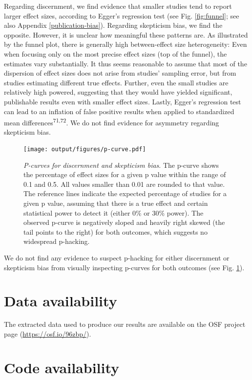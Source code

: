 \documentclass[
  man]{apa6}
\begin{document}
Regarding discernment, we find evidence that smaller studies tend to report larger effect sizes, according to Egger's regression test (see Fig. \ref{fig:funnel}; see also Appendix \ref{publication-bias}). Regarding skepticism bias, we find the opposite. However, it is unclear how meaningful these patterns are. As illustrated by the funnel plot, there is generally high between-effect size heterogeneity: Even when focusing only on the most precise effect sizes (top of the funnel), the estimates vary substantially. It thus seems reasonable to assume that most of the dispersion of effect sizes does not arise from studies' sampling error, but from studies estimating different true effects. Further, even the small studies are relatively high powered, suggesting that they would have yielded significant, publishable results even with smaller effect sizes. Lastly, Egger's regression test can lead to an inflation of false positive results when applied to standardized mean differences\textsuperscript{71,72}. We do not find evidence for asymmetry regarding skepticism bias.



\begin{figure}
\centering
\texttt{[image: output/figures/p-curve.pdf]}
\caption{\label{fig:p-curve}\emph{P-curves for discernment and skepticism bias}. The p-curve shows the percentage of effect sizes for a given p value within the range of 0.1 and 0.5. All values smaller than 0.01 are rounded to that value. The reference lines indicate the expected percentage of studies for a given p value, assuming that there is a true effect and certain statistical power to detect it (either 0\% or 30\% power). The observed p-curve is negatively sloped and heavily right skewed (the tail points to the right) for both outcomes, which suggests no widespread p-hacking.}
\end{figure}

We do not find any evidence to suspect p-hacking for either discernment or skepticism bias from visually inspecting p-curves for both outcomes (see Fig. \ref{fig:p-curve}).

\section{Data availability}\label{data-availability}

The extracted data used to produce our results are available on the OSF project page (\url{https://osf.io/96zbp/}).

\section{Code availability}\label{code-availability}
\end{document}
